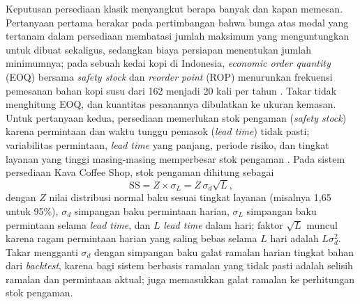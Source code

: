 Keputusan persediaan klasik menyangkut berapa banyak dan kapan memesan. Pertanyaan pertama berakar pada pertimbangan \citet*{harris1990many} bahwa bunga atas modal yang tertanam dalam persediaan membatasi jumlah maksimum yang menguntungkan untuk dibuat sekaligus, sedangkan biaya persiapan menentukan jumlah minimumnya; pada sebuah kedai kopi di Indonesia, \textit{economic order quantity} (EOQ) bersama \textit{safety stock} dan \textit{reorder point} (ROP) menurunkan frekuensi pemesanan bahan kopi susu dari 162 menjadi 20 kali per tahun \citep*{nurhalizapratiwi2025analisis}. Takar tidak menghitung EOQ, dan kuantitas pesanannya dibulatkan ke ukuran kemasan. Untuk pertanyaan kedua, persediaan memerlukan stok pengaman (\textit{safety stock}) karena permintaan dan waktu tunggu pemasok (\textit{lead time}) tidak pasti; variabilitas permintaan, \textit{lead time} yang panjang, periode risiko, dan tingkat layanan yang tinggi masing-masing memperbesar stok pengaman \citep*{yigit2023novel}. Pada sistem persediaan Kava Coffee Shop, stok pengaman dihitung sebagai \citep*{taufiq2025implementation}
\begin{equation}
\mathrm{SS} = Z \times \sigma_L = Z\,\sigma_d\sqrt{L},
\label{eq:safety-stock}
\end{equation}
dengan $Z$ nilai distribusi normal baku sesuai tingkat layanan (misalnya 1,65 untuk 95\%), $\sigma_d$ simpangan baku permintaan harian, $\sigma_L$ simpangan baku permintaan selama \textit{lead time}, dan $L$ \textit{lead time} dalam hari; faktor $\sqrt{L}$ muncul karena ragam permintaan harian yang saling bebas selama $L$ hari adalah $L\sigma_d^2$. Takar mengganti $\sigma_d$ dengan simpangan baku galat ramalan harian tingkat bahan dari \textit{backtest}, karena bagi sistem berbasis ramalan yang tidak pasti adalah selisih ramalan dan permintaan aktual; \citet*{lauren2026optimizing} juga memasukkan galat ramalan ke perhitungan stok pengaman.

